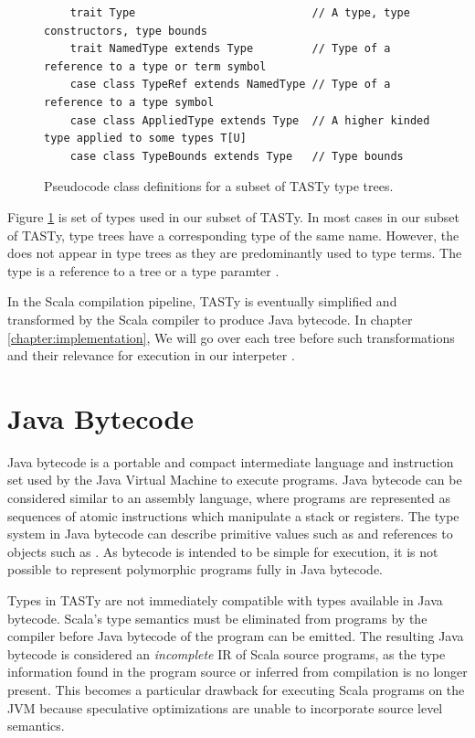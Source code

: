 \begin{figure}[!htb]
	\begin{verbatim}
	trait Type                           // A type, type constructors, type bounds
	trait NamedType extends Type         // Type of a reference to a type or term symbol
	case class TypeRef extends NamedType // Type of a reference to a type symbol
	case class AppliedType extends Type  // A higher kinded type applied to some types T[U]
	case class TypeBounds extends Type   // Type bounds
	\end{verbatim} 
	\caption{Pseudocode class definitions for a subset of TASTy type trees.}
	\label{tasty:types}
\end{figure}

Figure \ref{tasty:types} is set of types used in our subset of TASTy.
In most cases in our subset of TASTy, type trees have a corresponding type of the same name.
However, the  does not appear in type trees as they are predominantly used to type terms.
The  type is a reference to a  tree or a type paramter .

In the Scala compilation pipeline, TASTy is eventually simplified and transformed by the Scala compiler to produce Java bytecode. 
In chapter \ref{chapter:implementation}, We will go over each tree before such transformations and their relevance for execution in our interpeter .

\section{Java Bytecode}

Java bytecode is a portable and compact intermediate language and instruction set used by the Java Virtual Machine to execute programs.
Java bytecode can be considered similar to an assembly language, where programs are represented as sequences of atomic instructions which manipulate a stack or registers.
The type system in Java bytecode can describe primitive values such as  and references to objects such as .
As bytecode is intended to be simple for execution, it is not possible to represent polymorphic programs fully in Java bytecode.

Types in TASTy are not immediately compatible with types available in Java bytecode.
Scala's type semantics must be eliminated from programs by the compiler before Java bytecode of the program can be emitted.
The resulting Java bytecode is considered an \textit{incomplete} IR of Scala source programs, as the type information found in the program source or inferred from compilation is no longer present.
This becomes a particular drawback for executing Scala programs on the JVM because speculative optimizations are unable to incorporate source level semantics.

